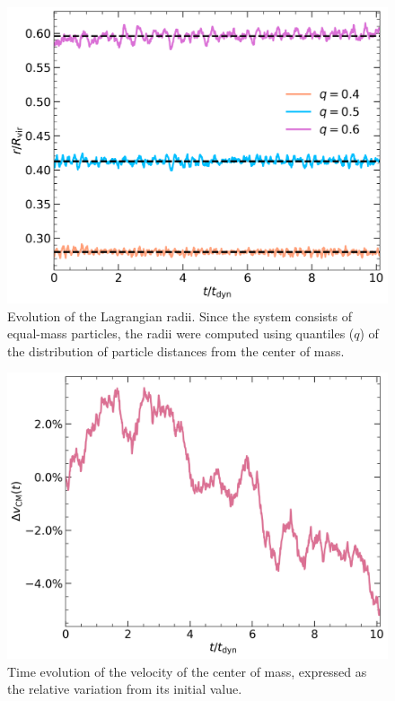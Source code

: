 \documentclass[twocolumn, a4paper]{article}
\begin{document}
\begin{figure}
    \centering
    \includegraphics[width=\columnwidth]{images/lag_rad.png}
    \caption{Evolution of the Lagrangian radii. Since the system consists of equal-mass particles, the radii were computed using quantiles (\(q\)) of the distribution of particle distances from the center of mass.}
    \label{fig:lag_rad}
\end{figure}

\begin{figure}
    \centering
    \includegraphics[width=\columnwidth]{images/cm.png}
    \caption{Time evolution of the velocity of the center of mass, expressed as the relative variation from its initial value.}
    \label{fig:cm_vel}
\end{figure}
\end{document}
